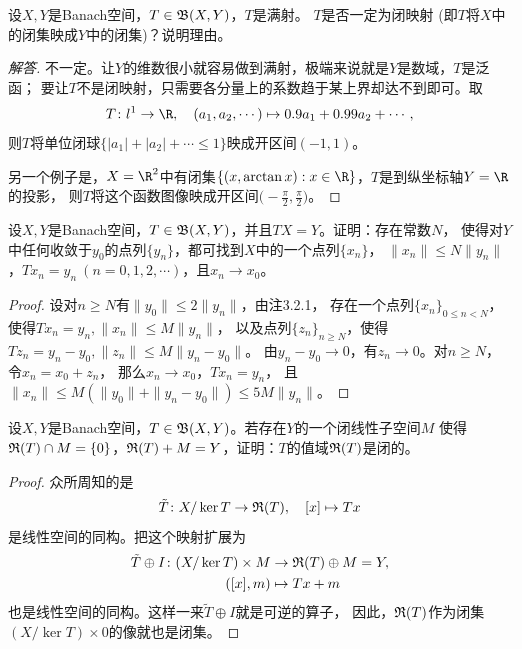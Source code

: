 \begin{4}
    设$X,Y$是Banach空间，$T\in\mathfrak{B}(X,Y)$，$T$是满射。
    $T$是否一定为闭映射 (即$T$将$X$中的闭集映成$Y$中的闭集)？说明理由。
\end{4}
\begin{proof}[解答]
    不一定。让$Y$的维数很小就容易做到满射，极端来说就是$Y$是数域，$T$是泛函；
    要让$T$不是闭映射，只需要各分量上的系数趋于某上界却达不到即可。取
    \[T\colon l^1\to\R,\quad(a_1,a_2,\cdots)\mapsto0.9a_1+0.99a_2+\cdots,\]
    则$T$将单位闭球$\{|a_1|+|a_2|+\cdots\leqslant1\}$映成开区间$(-1,1)$。

    另一个例子是，$X=\R^2$中有闭集$\{(x,\arctan x):x\in\R\}$，$T$是到纵坐标轴$Y=\R$的投影，
    则$T$将这个函数图像映成开区间$\big(\!-\!\frac{\pi}{2},\frac{\pi}{2}\big)$。
\end{proof}

\begin{5}
    设$X,Y$是Banach空间，$T\in\mathfrak{B}(X,Y)$，并且$TX=Y$。证明：存在常数$N$，
    使得对$Y$中任何收敛于$y_0$的点列$\{y_n\}$，都可找到$X$中的一个点列$\{x_n\}$，
    $\|x_n\|\leqslant N\|y_n\|$，$Tx_n=y_n\ (n=0,1,2,\cdots)$，且$x_n\to x_0$。
\end{5}
\begin{proof}
    设对$n\geqslant N$有$\|y_0\|\leqslant 2\|y_n\|$，由注3.2.1，
    存在一个点列$\{x_n\}_{0\leqslant n<N}$，使得$Tx_n=y_n,\|x_n\|\leqslant M\|y_n\|$，
    以及点列$\{z_n\}_{n\geqslant N}$，使得$Tz_n=y_n-y_0,\|z_n\|\leqslant M\|y_n-y_0\|$。
    由$y_n-y_0\to0$，有$z_n\to0$。对$n\geqslant N$，令$x_n=x_0+z_n$，
    那么$x_n\to x_0$，$Tx_n=y_n$，
    且$\|x_n\|\leqslant M(\|y_0\|+\|y_n-y_0\|)\leqslant5M\|y_n\|$。
\end{proof}

\begin{6}
    设$X,Y$是Banach空间，$T\in\mathfrak{B}(X,Y)$。若存在$Y$的一个闭线性子空间$M$
    使得$\mathfrak{R}(T)\cap M=\{0\}$，$\mathfrak{R}(T)+M=Y$，证明：$T$的值域$\mathfrak{R}(T)$是闭的。
\end{6}
\begin{proof}
    众所周知的是
    \[\tilde{T}\colon X/\ker T\to\mathfrak{R}(T),\quad[x] \mapsto Tx\]
    是线性空间的同构。把这个映射扩展为
    \begin{align*}
        \tilde{T} \oplus I\colon (X/\ker T) \times M&\to\mathfrak{R}(T) \oplus M=Y,\\
        ([x],m)&\mapsto Tx+m
    \end{align*}
    也是线性空间的同构。这样一来$\tilde{T} \oplus I$就是可逆的算子，
    因此，$\mathfrak{R}(T)$作为闭集$(X/\ker T)\times0$的像就也是闭集。
\end{proof}

